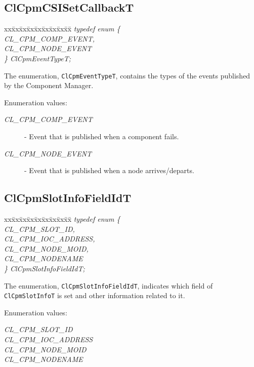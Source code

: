 {\subsection{ClCpmCSISetCallbackT}
   \begin{tabbing}
 xx\=xx\=xx\=xx\=xx\=xx\=xx\=xx\=xx\=\kill
\textit{typedef enum \{}\\
 \>\>\>\>\textit{CL\_CPM\_COMP\_EVENT,}\\
 \>\>\>\>\textit{CL\_CPM\_NODE\_EVENT}\\
 \textit{\} ClCpmEventTypeT;}\\
\end{tabbing}
The enumeration, {\tt{ClCpmEventTypeT}}, contains the types of the events published by the Component Manager. 
\begin{Desc}
\item[Enumeration values: ]\par
\begin{description}
\item[{\em CL\_\-CPM\_\-COMP\_\-EVENT}] - Event that is published when a component fails. 
\item[{\em CL\_\-CPM\_\-NODE\_\-EVENT}] - Event that is published when a node arrives/departs. 
\end{description}
\end{Desc}




\subsection{ClCpmSlotInfoFieldIdT}
\begin{tabbing}
xx\=xx\=xx\=xx\=xx\=xx\=xx\=xx\=xx\=\kill
\textit{typedef enum \{}\\
\>\>\>\>\textit{CL\_CPM\_SLOT\_ID,}\\
\>\>\>\>\textit{CL\_CPM\_IOC\_ADDRESS,}\\
\>\>\>\>\textit{CL\_CPM\_NODE\_MOID,}\\
\>\>\>\>\textit{CL\_CPM\_NODENAME}\\
\textit{\} ClCpmSlotInfoFieldIdT;}\end{tabbing}

The enumeration, {\tt{ClCpmSlotInfoFieldIdT}}, indicates which field of {\tt{Cl\-Cpm\-Slot\-Info\-T}} is set and 
other information related to it.

\begin{Desc}
\item[Enumeration values: ]\par
\begin{description}
\item[{\em CL\_\-CPM\_\-SLOT\_\-ID}]
\item[{\em CL\_\-CPM\_\-IOC\_\-ADDRESS}]
\item[{\em CL\_\-CPM\_\-NODE\_\-MOID}]
\item[{\em CL\_\-CPM\_\-NODENAME}]
\end{description}
\end{Desc}




}

